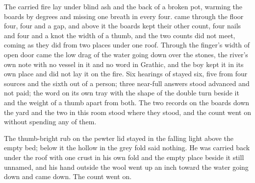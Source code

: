 The carried fire lay under blind ash and the back of a broken pot, warming the boards by degrees and missing one breath in every four.  came through the floor four, four and a gap, and above it the boards kept their other count, four nails and four and a knot the width of a thumb, and the two counts did not meet, coming as they did from two places under one roof. Through the finger's width of open door came the low drag of the water going down over the stones, the river's own note with no vessel in it and no word in Grathic, and the boy kept it in its own place and did not lay it on the fire. Six hearings of  stayed six, five from four sources and the sixth out of a person; three near-full answers stood advanced and not paid; the word on its own tray with the shape of the double turn beside it and the weight of a thumb apart from both. The two records on the boards down the yard and the two in this room stood where they stood, and the count went on without spending any of them.

The thumb-bright rub on the pewter lid stayed in the falling light above the empty bed; below it the hollow in the grey fold said nothing. He was carried back under the roof with one crust in his own fold and the empty place beside it still unnamed, and his hand outside the wool went up an inch toward the water going down and came down. The count went on.
